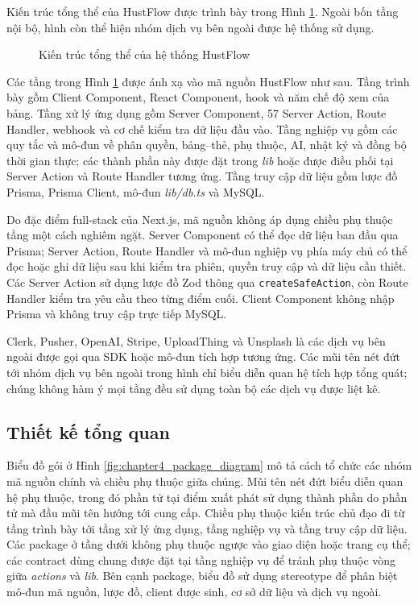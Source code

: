 \documentclass[../DoAn.tex]{subfiles}
\begin{document}
Kiến trúc tổng thể của HustFlow được trình bày trong Hình \ref{fig:chapter4_system_architecture}. Ngoài bốn tầng nội bộ, hình còn thể hiện nhóm dịch vụ bên ngoài được hệ thống sử dụng.

\begin{figure}[H]
    \centering
    \caption{Kiến trúc tổng thể của hệ thống HustFlow}
    \label{fig:chapter4_system_architecture}
\end{figure}

Các tầng trong Hình \ref{fig:chapter4_system_architecture} được ánh xạ vào mã nguồn HustFlow như sau. Tầng trình bày gồm Client Component, React Component, hook và năm chế độ xem của bảng. Tầng xử lý ứng dụng gồm Server Component, 57 Server Action, Route Handler, webhook và cơ chế kiểm tra dữ liệu đầu vào. Tầng nghiệp vụ gồm các quy tắc và mô-đun về phân quyền, bảng--thẻ, phụ thuộc, AI, nhật ký và đồng bộ thời gian thực; các thành phần này được đặt trong \textit{lib} hoặc được điều phối tại Server Action và Route Handler tương ứng. Tầng truy cập dữ liệu gồm lược đồ Prisma, Prisma Client, mô-đun \textit{lib/db.ts} và MySQL.

Do đặc điểm full-stack của Next.js, mã nguồn không áp dụng chiều phụ thuộc tầng một cách nghiêm ngặt. Server Component có thể đọc dữ liệu ban đầu qua Prisma; Server Action, Route Handler và mô-đun nghiệp vụ phía máy chủ có thể đọc hoặc ghi dữ liệu sau khi kiểm tra phiên, quyền truy cập và dữ liệu cần thiết. Các Server Action sử dụng lược đồ Zod thông qua \texttt{createSafeAction}, còn Route Handler kiểm tra yêu cầu theo từng điểm cuối. Client Component không nhập Prisma và không truy cập trực tiếp MySQL.

Clerk, Pusher, OpenAI, Stripe, UploadThing và Unsplash là các dịch vụ bên ngoài được gọi qua SDK hoặc mô-đun tích hợp tương ứng. Các mũi tên nét đứt tới nhóm dịch vụ bên ngoài trong hình chỉ biểu diễn quan hệ tích hợp tổng quát; chúng không hàm ý mọi tầng đều sử dụng toàn bộ các dịch vụ được liệt kê.

\subsection{Thiết kế tổng quan}
\label{subsection:4.1.2}

Biểu đồ gói ở Hình \ref{fig:chapter4_package_diagram} mô tả cách tổ chức các nhóm mã nguồn chính và chiều phụ thuộc giữa chúng. Mũi tên nét đứt biểu diễn quan hệ phụ thuộc, trong đó phần tử tại điểm xuất phát sử dụng thành phần do phần tử mà đầu mũi tên hướng tới cung cấp. Chiều phụ thuộc kiến trúc chủ đạo đi từ tầng trình bày tới tầng xử lý ứng dụng, tầng nghiệp vụ và tầng truy cập dữ liệu. Các package ở tầng dưới không phụ thuộc ngược vào giao diện hoặc trang cụ thể; các contract dùng chung được đặt tại tầng nghiệp vụ để tránh phụ thuộc vòng giữa \textit{actions} và \textit{lib}. Bên cạnh package, biểu đồ sử dụng stereotype để phân biệt mô-đun mã nguồn, lược đồ, client được sinh, cơ sở dữ liệu và dịch vụ ngoài.
\end{document}

